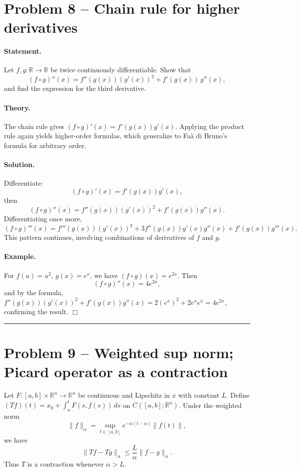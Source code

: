 \documentclass[12pt,a4paper]{article}
\theoremstyle{plain}
\theoremstyle{definition}
\theoremstyle{remark}
\theoremstyle{remark}
\begin{document}
\section*{Problem 8 -- Chain rule for higher derivatives}

\paragraph{Statement.}
Let $f,g:\mathbb{R}\to\mathbb{R}$ be twice continuously differentiable.
Show that
\[
(f\circ g)''(x) = f''(g(x))(g'(x))^2 + f'(g(x))\,g''(x),
\]
and find the expression for the third derivative.

\paragraph{Theory.}
The chain rule gives $(f\circ g)'(x)=f'(g(x))g'(x)$.
Applying the product rule again yields higher-order formulas,
which generalize to Faà di Bruno’s formula for arbitrary order.

\paragraph{Solution.}
Differentiate:
\[
(f\circ g)'(x)=f'(g(x))g'(x),
\]
then
\[
(f\circ g)''(x)=f''(g(x))(g'(x))^2+f'(g(x))g''(x).
\]
Differentiating once more,
\[
(f\circ g)'''(x)=f'''(g(x))(g'(x))^3
+3f''(g(x))g'(x)g''(x)
+f'(g(x))g'''(x).
\]
This pattern continues, involving combinations of derivatives of $f$ and $g$.

\paragraph{Example.}
For $f(u)=u^2$, $g(x)=e^x$, we have $(f\circ g)(x)=e^{2x}$.
Then
\[
(f\circ g)''(x)=4e^{2x},
\]
and by the formula,
$f''(g(x))(g'(x))^2+f'(g(x))g''(x)=2(e^x)^2+2e^x e^x=4e^{2x}$, confirming the result.
\hfill$\Box$

\bigskip\hrule\bigskip

\section*{Problem 9 -- Weighted sup norm; Picard operator as a contraction}
Let $F:[a,b]\times\mathbb{R}^n\to\mathbb{R}^n$ be continuous and Lipschitz in $x$
with constant $L$.
Define $(Tf)(t)=x_0+\int_a^t F(s,f(s))\,ds$ on $C([a,b];\mathbb{R}^n)$.
Under the weighted norm
\[
\|f\|_\alpha=\sup_{t\in[a,b]}e^{-\alpha(t-a)}\|f(t)\|,
\]
we have
\[
\|Tf-Tg\|_\alpha\le \frac{L}{\alpha}\|f-g\|_\alpha.
\]
Thus $T$ is a contraction whenever $\alpha>L$.
\end{document}
